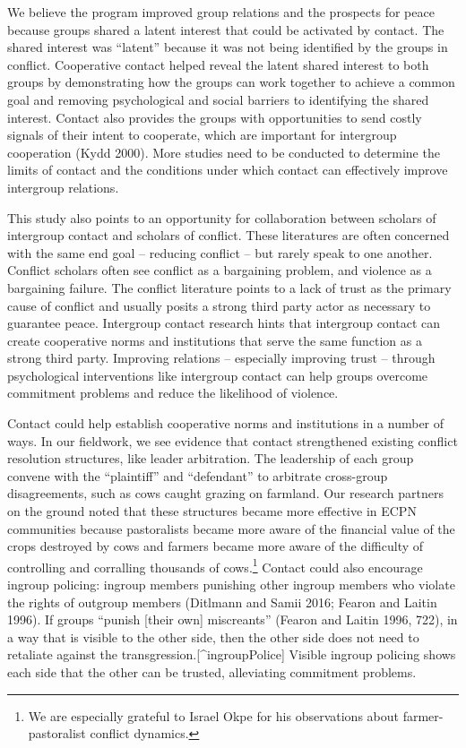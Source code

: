 \documentclass[11pt]{article}
\begin{document}
We believe the program improved group relations and the prospects for
peace because groups shared a latent interest that could be activated by
contact. The shared interest was ``latent'' because it was not being
identified by the groups in conflict. Cooperative contact helped reveal
the latent shared interest to both groups by demonstrating how the
groups can work together to achieve a common goal and removing
psychological and social barriers to identifying the shared interest.
Contact also provides the groups with opportunities to send costly
signals of their intent to cooperate, which are important for intergroup
cooperation (Kydd 2000). More studies need to be conducted to determine
the limits of contact and the conditions under which contact can
effectively improve intergroup relations.

This study also points to an opportunity for collaboration between
scholars of intergroup contact and scholars of conflict. These
literatures are often concerned with the same end goal -- reducing
conflict -- but rarely speak to one another. Conflict scholars often see
conflict as a bargaining problem, and violence as a bargaining failure.
The conflict literature points to a lack of trust as the primary cause
of conflict and usually posits a strong third party actor as necessary
to guarantee peace. Intergroup contact research hints that intergroup
contact can create cooperative norms and institutions that serve the
same function as a strong third party. Improving relations -- especially
improving trust -- through psychological interventions like intergroup
contact can help groups overcome commitment problems and reduce the
likelihood of violence.

Contact could help establish cooperative norms and institutions in a
number of ways. In our fieldwork, we see evidence that contact
strengthened existing conflict resolution structures, like leader
arbitration. The leadership of each group convene with the ``plaintiff''
and ``defendant'' to arbitrate cross-group disagreements, such as cows
caught grazing on farmland. Our research partners on the ground noted
that these structures became more effective in ECPN communities because
pastoralists became more aware of the financial value of the crops
destroyed by cows and farmers became more aware of the difficulty of
controlling and corralling thousands of cows.\footnote{We are especially
  grateful to Israel Okpe for his observations about farmer-pastoralist
  conflict dynamics.} Contact could also encourage ingroup policing:
ingroup members punishing other ingroup members who violate the rights
of outgroup members (Ditlmann and Samii 2016; Fearon and Laitin 1996).
If groups ``punish {[}their own{]} miscreants'' (Fearon and Laitin 1996,
722), in a way that is visible to the other side, then the other side
does not need to retaliate against the
transgression.{[}\^{}ingroupPolice{]} Visible ingroup policing shows
each side that the other can be trusted, alleviating commitment
problems.
\end{document}
